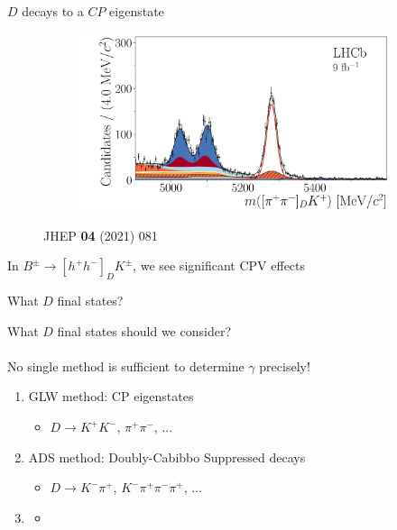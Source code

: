 \documentclass[dvipsnames]{beamer}
\begin{document}
\begin{frame}{$D$ decays to a $C\!P$ eigenstate}
\begin{figure}
\begin{subfigure}{0.45\textwidth}
    \end{subfigure}%
    \begin{subfigure}{0.45\textwidth}
      \includegraphics[width = 1.0\textwidth]{Plots/B2DK_D2pipi_Plus.pdf}
    \end{subfigure}
    \caption*{\tiny JHEP \textbf{04} (2021) 081}
  \end{figure}
  \vspace{-0.5cm}
  \begin{center}
    \Large In $B^\pm\to[h^+h^-]_DK^\pm$, we see significant CPV effects
  \end{center}
\end{frame}

\begin{frame}{What $D$ final states?}
  \begin{center}
    \Large What $D$ final states should we consider?\\~\\
    \Large No single method is sufficient to determine $\gamma$ precisely!
  \end{center}
  \vspace{0.2cm}
  \begin{enumerate}
    \setlength\itemsep{1.0em}
    \item{GLW method: CP eigenstates}
    \begin{itemize}
      \item{$D\to K^+K^-$, $\pi^+\pi^-$, ...}
    \end{itemize}
    \item{ADS method: Doubly-Cabibbo Suppressed decays}
    \begin{itemize}
      \item{$D\to K^-\pi^+$, $K^-\pi^+\pi^-\pi^+$, ...}
    \end{itemize}
    \item{\phantom{BPGGSZ method: Multi-body final states}}
    \begin{itemize}
      \item[]{\phantom{$D\to K_S^0\pi^+\pi^-$, $K_S^0K^+K^-$, ...}}
    \end{itemize}
  \end{enumerate}
\end{frame}
\end{document}
